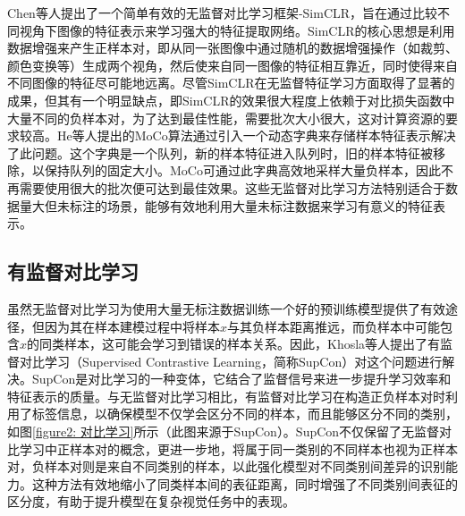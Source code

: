Chen等人\cite{SimCLR}提出了一个简单有效的无监督对比学习框架-SimCLR，旨在通过比较不同视角下图像的特征表示来学习强大的特征提取网络。SimCLR的核心思想是利用数据增强来产生正样本对，即从同一张图像中通过随机的数据增强操作（如裁剪、颜色变换等）生成两个视角，然后使来自同一图像的特征相互靠近，同时使得来自不同图像的特征尽可能地远离。尽管SimCLR在无监督特征学习方面取得了显著的成果，但其有一个明显缺点，即SimCLR的效果很大程度上依赖于对比损失函数中大量不同的负样本对，为了达到最佳性能，需要批次大小很大，这对计算资源的要求较高。He等人\cite{MoCo}提出的MoCo算法通过引入一个动态字典来存储样本特征表示解决了此问题。这个字典是一个队列，新的样本特征进入队列时，旧的样本特征被移除，以保持队列的固定大小。MoCo可通过此字典高效地采样大量负样本，因此不再需要使用很大的批次便可达到最佳效果。这些无监督对比学习方法特别适合于数据量大但未标注的场景，能够有效地利用大量未标注数据来学习有意义的特征表示。


\subsection[\hspace{-2pt}有监督对比学习]{{\heiti{} \hspace{-8pt}有监督对比学习}}\label{section2: 有监督对比学习}

虽然无监督对比学习为使用大量无标注数据训练一个好的预训练模型提供了有效途径，但因为其在样本建模过程中将样本$x$与其负样本距离推远，而负样本中可能包含$x$的同类样本，这可能会学习到错误的样本关系。因此，Khosla等人\cite{SupCon}提出了有监督对比学习（Supervised Contrastive Learning，简称SupCon）对这个问题进行解决。SupCon是对比学习的一种变体，它结合了监督信号来进一步提升学习效率和特征表示的质量。与无监督对比学习相比，有监督对比学习在构造正负样本对时利用了标签信息，以确保模型不仅学会区分不同的样本，而且能够区分不同的类别，如图\ref{figure2: 对比学习}所示（此图来源于SupCon\cite{SupCon}）。SupCon不仅保留了无监督对比学习中正样本对的概念，更进一步地，将属于同一类别的不同样本也视为正样本对，负样本对则是来自不同类别的样本，以此强化模型对不同类别间差异的识别能力。这种方法有效地缩小了同类样本间的表征距离，同时增强了不同类别间表征的区分度，有助于提升模型在复杂视觉任务中的表现。

